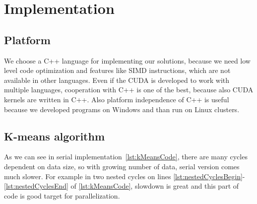 \chapter{Implementation} \label{sec:implementation}
\section{Platform}
We choose a C++ language for implementing our solutions, because we need low level code optimization and features like SIMD instructions, which are not available in other languages. Even if the CUDA is developed to work with multiple languages, cooperation with  C++ is one of the best, because also CUDA kernels are written in C++. Also platform independence of C++ is useful because we developed programs on Windows and than run on Linux clusters.

\section{K-means algorithm} \label{sec:kMeansAlgorithm}

As we can see in serial implementation~\autoref{lst:kMeansCode}, there are many cycles dependent on data size, so with growing number of data, serial version comes much slower. For example in two nested cycles on lines \autoref{lst:nestedCyclesBegin}-\autoref{lst:nestedCyclesEnd} of \autoref{lst:kMeansCode}, slowdown is great and this part of code is good target for parallelization.\\

